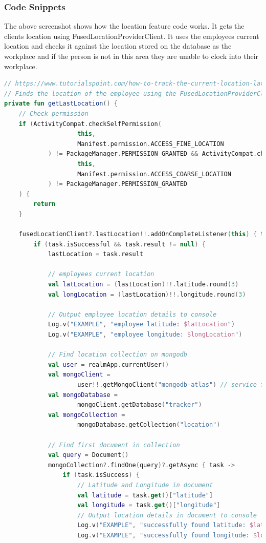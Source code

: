 \subsubsection{Code Snippets}
The above screenshot shows how the location feature code works. It gets the clients location using FusedLocationProviderClient. It uses the employees current location and checks it against the location stored on the database as the workplace and if the person is not in this area they are unable to clock into their workplace.
\begin{lstlisting}[caption={Location code}, label={lst:example1}, language=Kotlin]
// https://www.tutorialspoint.com/how-to-track-the-current-location-latitude-and-longitude-in-an-android-device-using-kotlin
// Finds the location of the employee using the FusedLocationProviderClient
private fun getLastLocation() {
    // Check permission
    if (ActivityCompat.checkSelfPermission(
                    this,
                    Manifest.permission.ACCESS_FINE_LOCATION
            ) != PackageManager.PERMISSION_GRANTED && ActivityCompat.checkSelfPermission(
                    this,
                    Manifest.permission.ACCESS_COARSE_LOCATION
            ) != PackageManager.PERMISSION_GRANTED
    ) {
        return
    }

    fusedLocationClient?.lastLocation!!.addOnCompleteListener(this) { task ->
        if (task.isSuccessful && task.result != null) {
            lastLocation = task.result

            // employees current location
            val latLocation = (lastLocation)!!.latitude.round(3)
            val longLocation = (lastLocation)!!.longitude.round(3)

            // Output employee location details to console
            Log.v("EXAMPLE", "employee latitude: $latLocation")
            Log.v("EXAMPLE", "employee longitude: $longLocation")

            // Find location collection on mongodb
            val user = realmApp.currentUser()
            val mongoClient =
                    user!!.getMongoClient("mongodb-atlas") // service for MongoDB Atlas cluster containing custom user data
            val mongoDatabase =
                    mongoClient.getDatabase("tracker")
            val mongoCollection =
                    mongoDatabase.getCollection("location")

            // Find first document in collection
            val query = Document()
            mongoCollection?.findOne(query)?.getAsync { task ->
                if (task.isSuccess) {
                    // Latitude and Longitude in document
                    val latitude = task.get()["latitude"]
                    val longitude = task.get()["longitude"]
                    // Output location details in document to console
                    Log.v("EXAMPLE", "successfully found latitude: $latitude")
                    Log.v("EXAMPLE", "successfully found longitude: $longitude")


\end{lstlisting}

